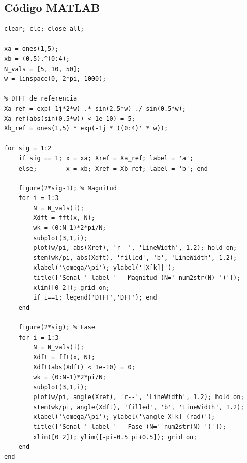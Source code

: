 \documentclass[../Main_Include.tex]{subfiles}
\begin{document}
\subsection*{Código MATLAB}

\begin{lstlisting}[style=matlab_dark,
    caption={Ejercicio 5 --- DFT con zero-padding vs.\ DTFT},
    label={lst:ej5}]
% ETN1015 - Ejercicio 5: DFT con zero-padding vs DTFT
clear; clc; close all;

xa = ones(1,5);
xb = (0.5).^(0:4);
N_vals = [5, 10, 50];
w = linspace(0, 2*pi, 1000);

% DTFT de referencia
Xa_ref = exp(-1j*2*w) .* sin(2.5*w) ./ sin(0.5*w);
Xa_ref(abs(sin(0.5*w)) < 1e-10) = 5;
Xb_ref = ones(1,5) * exp(-1j * ((0:4)' * w));

for sig = 1:2
    if sig == 1; x = xa; Xref = Xa_ref; label = 'a';
    else;        x = xb; Xref = Xb_ref; label = 'b'; end

    figure(2*sig-1); % Magnitud
    for i = 1:3
        N = N_vals(i);
        Xdft = fft(x, N);
        wk = (0:N-1)*2*pi/N;
        subplot(3,1,i);
        plot(w/pi, abs(Xref), 'r--', 'LineWidth', 1.2); hold on;
        stem(wk/pi, abs(Xdft), 'filled', 'b', 'LineWidth', 1.2);
        xlabel('\omega/\pi'); ylabel('|X[k]|');
        title(['Senal ' label ' - Magnitud (N=' num2str(N) ')']);
        xlim([0 2]); grid on;
        if i==1; legend('DTFT','DFT'); end
    end

    figure(2*sig); % Fase
    for i = 1:3
        N = N_vals(i);
        Xdft = fft(x, N);
        Xdft(abs(Xdft) < 1e-10) = 0;
        wk = (0:N-1)*2*pi/N;
        subplot(3,1,i);
        plot(w/pi, angle(Xref), 'r--', 'LineWidth', 1.2); hold on;
        stem(wk/pi, angle(Xdft), 'filled', 'b', 'LineWidth', 1.2);
        xlabel('\omega/\pi'); ylabel('\angle X[k] (rad)');
        title(['Senal ' label ' - Fase (N=' num2str(N) ')']);
        xlim([0 2]); ylim([-pi-0.5 pi+0.5]); grid on;
    end
end
\end{lstlisting}


\end{document}
